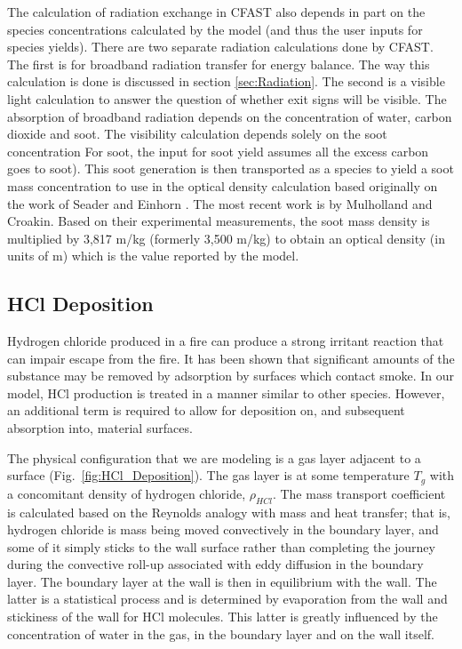 The calculation of radiation exchange in CFAST also depends in part on the species concentrations calculated by the model (and thus the user inputs for species yields). There are two separate radiation calculations done by CFAST. The first is for broadband radiation transfer for energy balance. The way this calculation is done is discussed in section \ref{sec:Radiation}. The second is a visible light calculation to answer the question of whether exit signs will be visible. The absorption of broadband radiation depends on the concentration of water, carbon dioxide and soot. The visibility calculation depends solely on the soot concentration For soot, the input for soot yield  assumes all the excess carbon goes to soot). This soot generation is then transported as a species to yield a soot mass concentration to use in the optical density calculation based originally on the work of Seader and Einhorn \cite{Seader:1976}. The most recent work is by Mulholland and Croakin\cite{Mullholland:2000}. Based on their experimental measurements, the soot mass density is multiplied by 3,817 m/kg (formerly 3,500 m/kg) to obtain an optical density (in units of m) which is the value reported by the model.

\subsection{HCl Deposition}\label{HClDeposition}

Hydrogen chloride produced in a fire can produce a strong irritant reaction that can impair escape from the fire.  It has been shown \cite{Galloway:1989} that significant amounts of the substance may be removed by adsorption by surfaces which contact smoke.  In our model, HCl production is treated in a manner similar to other species.  However, an additional term is required to allow for deposition on, and subsequent absorption into, material surfaces.

The physical configuration that we are modeling is a gas layer adjacent to a surface (Fig.~\ref{fig:HCl_Deposition}).  The gas layer is at some temperature $T_g$ with a concomitant density of hydrogen chloride, $\rho_{HCl}$.  The mass transport coefficient is calculated based on the Reynolds analogy with mass and heat transfer; that is, hydrogen chloride is mass being moved convectively in the boundary layer, and some of it simply sticks to the wall surface rather than completing the journey during the convective roll-up associated with eddy diffusion in the boundary layer.  The boundary layer at the wall is then in equilibrium with the wall.  The latter is a statistical process and is determined by evaporation from the wall and stickiness of the wall for HCl molecules.  This latter is greatly influenced by the concentration of water in the gas, in the boundary layer and on the wall itself.

